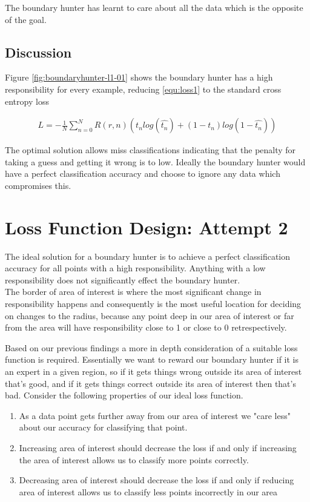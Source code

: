 \documentclass[notitlepage]{report}
\theoremstyle{definition}
\begin{document}
The boundary hunter has learnt to care about all the data which is the opposite of the goal.

\subsection{Discussion}
Figure \ref{fig:boundaryhunter-l1-01} shows the boundary hunter has a high responsibility for every example, reducing \ref{equ:loss1} to the standard cross entropy loss

\begin{align*}
L = -\frac{1}{N} \sum_{n=0}^N R(r, n) (t_n log(\widehat{t_n}) + (1-t_n)log(1 - \widehat{t_n}))
\end{align*} 

The optimal solution allows miss classifications indicating that the penalty for taking a guess and getting it wrong is to low. Ideally the boundary hunter would have a perfect classification accuracy and choose to ignore any data which compromises this.

\section{Loss Function Design: Attempt 2}
The ideal solution for a boundary hunter is to achieve a perfect classification accuracy for all points with a high responsibility. Anything with a low responsibility does not significantly effect the boundary hunter.\\

The border of area of interest is where the most significant change in responsibility happens and  consequently is the most useful location for deciding on changes to the radius, because any point deep in our area of interest or far from the area will have responsibility close to 1 or close to 0 retrespectively.

Based on our previous findings a more in depth consideration of a suitable loss function is required. Essentially we want to reward our boundary hunter if it is an expert in a given region, so if it gets things wrong outside its area of interest that's good, and if it gets things correct outside its area of interest then that's bad. Consider the following properties of our ideal loss function.

\begin{enumerate}
\item As a data point gets further away from our area of interest we "care less" about our accuracy for classifying that point.
\item Increasing area of interest should decrease the loss if and only if increasing the area of interest allows us to classify more points correctly.
\item Decreasing area of interest should decrease the loss if and only if reducing area of interest allows us to classify less points incorrectly in our area
\end{enumerate}
\end{document}
